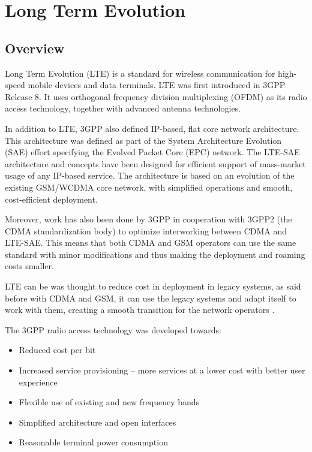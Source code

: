 
\section{Long Term Evolution} %
\label{let:lte}

\subsection{Overview}

Long Term Evolution (LTE) is a standard for wireless communication for high-speed
mobile devices and data terminals. LTE was first introduced in 3GPP Release 8.
It uses orthogonal frequency division multiplexing (OFDM) as its radio access
technology, together with advanced antenna technologies.

In addition to LTE, 3GPP also defined IP-based, flat core network architecture.
This architecture was defined as part of the System Architecture Evolution (SAE)
effort specifying the Evolved Packet Core (EPC) network. The LTE-SAE architecture
and concepts have been designed for efficient support of mass-market usage of any
IP-based service. The architecture is based on an evolution of the existing GSM/WCDMA
core network, with simplified operations and smooth, cost-efficient deployment.

Moreover, work has also been done by 3GPP in cooperation with 3GPP2 (the CDMA
standardization body) to optimize interworking between CDMA and LTE-SAE. This means
that both CDMA and GSM operators can use the same standard with minor modifications
and thus making the deployment and roaming costs smaller.

LTE can be was thought to reduce cost in deployment in legacy systems, as said
before with CDMA and GSM, it can use the legacy systems and adapt itself to work
with them, creating a smooth transition for the network operators \cite{introlte}.

The 3GPP radio access  technology was developed towards:

\begin{itemize}
    \item Reduced cost per bit
    \item Increased service provisioning – more services at a lower cost with
    better user experience
    \item Flexible use of existing and new frequency bands
    \item Simplified architecture and open interfaces
    \item Reasonable terminal power consumption
\end{itemize}

